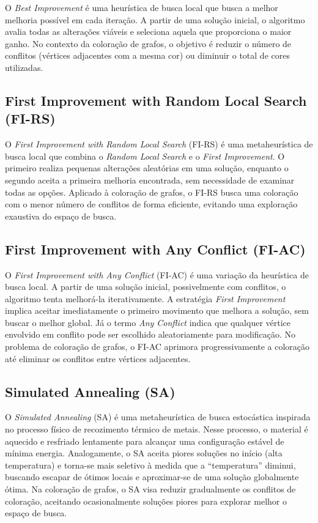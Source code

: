 \documentclass[12pt,a4paper]{article}
\begin{document}
O \textit{Best Improvement} é uma heurística de busca local que busca a melhor melhoria possível em cada iteração. A partir de uma solução inicial, o algoritmo avalia todas as alterações viáveis e seleciona aquela que proporciona o maior ganho.  
No contexto da coloração de grafos, o objetivo é reduzir o número de conflitos (vértices adjacentes com a mesma cor) ou diminuir o total de cores utilizadas.

\subsection{First Improvement with Random Local Search (FI-RS)}

O \textit{First Improvement with Random Local Search} (FI-RS) é uma metaheurística de busca local que combina o \textit{Random Local Search} e o \textit{First Improvement}.  
O primeiro realiza pequenas alterações aleatórias em uma solução, enquanto o segundo aceita a primeira melhoria encontrada, sem necessidade de examinar todas as opções.  
Aplicado à coloração de grafos, o FI-RS busca uma coloração com o menor número de conflitos de forma eficiente, evitando uma exploração exaustiva do espaço de busca.

\subsection{First Improvement with Any Conflict (FI-AC)}

O \textit{First Improvement with Any Conflict} (FI-AC) é uma variação da heurística de busca local. A partir de uma solução inicial, possivelmente com conflitos, o algoritmo tenta melhorá-la iterativamente.  
A estratégia \textit{First Improvement} implica aceitar imediatamente o primeiro movimento que melhora a solução, sem buscar o melhor global. Já o termo \textit{Any Conflict} indica que qualquer vértice envolvido em conflito pode ser escolhido aleatoriamente para modificação.  
No problema de coloração de grafos, o FI-AC aprimora progressivamente a coloração até eliminar os conflitos entre vértices adjacentes.

\subsection{Simulated Annealing (SA)}

O \textit{Simulated Annealing} (SA) é uma metaheurística de busca estocástica inspirada no processo físico de recozimento térmico de metais. Nesse processo, o material é aquecido e resfriado lentamente para alcançar uma configuração estável de mínima energia.  
Analogamente, o SA aceita piores soluções no início (alta temperatura) e torna-se mais seletivo à medida que a “temperatura” diminui, buscando escapar de ótimos locais e aproximar-se de uma solução globalmente ótima.  
Na coloração de grafos, o SA visa reduzir gradualmente os conflitos de coloração, aceitando ocasionalmente soluções piores para explorar melhor o espaço de busca.
\end{document}
